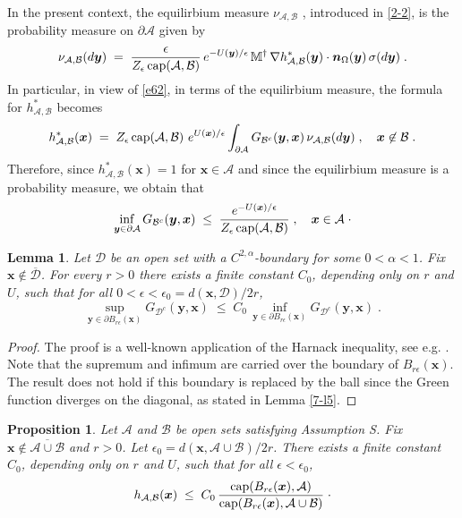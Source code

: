 \documentclass[reqno]{amsart}
\newtheorem{lemma}[theorem]{Lemma}
\newtheorem{proposition}[theorem]{Proposition}
\newcounter{as}[section]
\newcommand{\mc}[1]{{\mathcal #1}}
\newcommand{\bb}[1]{{\mathbb #1}}
\newcommand{\bs}[1]{{\boldsymbol #1}}
\newcommand{\<}{\langle}
\renewcommand{\>}{\rangle}
\renewcommand{\Cap}{{\rm cap}}
\begin{document}
In the present context, the equilirbium measure $\nu_{\mc A, \mc B}$ ,
introduced in \eqref{2-2}, is the probability measure on $\partial \mc A$ given by
\begin{equation}
\label{7-15}
\nu_{\mc A, \mc B} (d\bs y) \;=\; \frac{\epsilon}{Z_\epsilon\,
  \Cap(\mc A,\mc B)} \, e^{- U(\bs y)/\epsilon}\, \bb M^\dagger \,
\nabla h^*_{\mc A,\mc B} (\bs y) \cdot \bs n_{\Omega}(\bs y) \,
\sigma (d \bs y)\;.
\end{equation}
In particular, in view of \eqref{e62}, in terms of the equilirbium
measure, the formula for $h^*_{\mc A,\mc B}$ becomes
\begin{equation*}
h^*_{\mc A,\mc B} (\bs x) \;=\; Z_\epsilon\, \Cap(\mc A,\mc B) \,
\, e^{U(\bs x)/\epsilon} \int_{\partial \mc A} G_{\mc B^c} (\bs y, \bs x)
\, \nu_{\mc A, \mc B} (d \bs y)\;, \quad \bs x\not\in\mc B\;.
\end{equation*}
Therefore, since $h^*_{\mc A,\mc B} (\bs x)=1$ for $\bs x\in \mc A$ and since the equilirbium measure is a probability measure, we obtain
that
\begin{equation}
\label{7-4}
\inf_{\bs y\in \partial \mc A} G_{\mc B^c} (\bs y, \bs x) \;\le\;
\frac{e^{-U(\bs x)/\epsilon}} {Z_\epsilon\, \Cap(\mc A,\mc B)} \;,
\quad \bs x\in \mc A  \;\cdot
\end{equation}

\begin{lemma}
\label{7-l9}
Let $\mc D$ be an open set with a $C^{2,\alpha}$-boundary for some
$0<\alpha<1$. Fix $\bs x\not\in \overline{\mc D}$. For every $r>0$
there exists a finite constant $C_0$, depending only on $r$ and $U$,
such that for all $0<\epsilon <\epsilon_0 = d(\bs x, \mc D)/2r$,
\begin{equation*}
\sup_{\bs y\in \partial B_{r\epsilon}(\bs x) } G_{\mc D^c} (\bs y, \bs x) \;\le\;
C_0\, \inf_{\bs y\in \partial B_{r\epsilon}(\bs x)} G_{\mc D^c} (\bs y, \bs x) \;.
\end{equation*}
\end{lemma}

\begin{proof}
The proof is a well-known application of the Harnack inequality, see
e.g. \cite[Lemma 4.6]{BEGK1}. Note that the
supremum and infimum are carried over the boundary of
$B_{r\epsilon}(\bs x)$. The result does not hold if this boundary is
replaced by the ball since the Green function diverges on the
diagonal, as stated in Lemma \ref{7-l5}.
\end{proof}

\begin{proposition}
\label{7-l6}
Let $\mc A$ and $\mc B$ be open sets satisfying Assumption S. Fix
$\bs x\not\in \overline{\mc A\cup \mc B}$ and $r>0$. Let $\epsilon_0 = d(\bs x,
\mc A\cup \mc B)/2r$. There exists a finite constant $C_0$, depending
only on $r$ and $U$, such that for all $\epsilon < \epsilon_0$,
\begin{equation*}
h_{\mc A, \mc B}(\bs x) \;\le\; C_0\,
\frac{\Cap (B_{r\epsilon}(\bs x), \mc A) }
{\Cap (B_{r\epsilon}(\bs x), \mc A \cup \mc B) }\;\cdot
\end{equation*}
\end{proposition}
\end{document}
